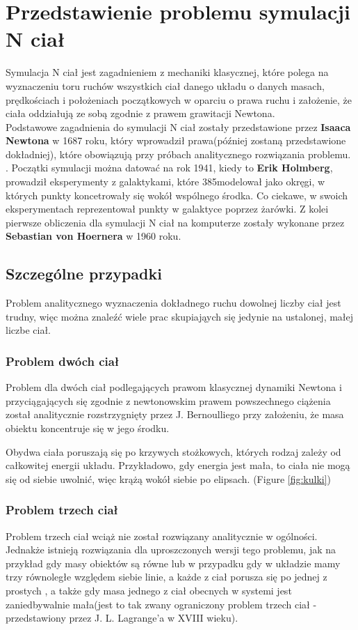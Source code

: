 \documentclass[14pt,twoside,a4paper]{article}
\theoremstyle{definition}
\begin{document}
\section{\LARGE Przedstawienie problemu symulacji N ciał}
\bigskip
Symulacja N ciał jest zagadnieniem z mechaniki klasycznej, które polega na wyznaczeniu toru ruchów wszystkich ciał danego układu o danych masach, prędkościach i położeniach początkowych w oparciu o prawa ruchu i założenie, że ciała oddziałują ze sobą zgodnie z prawem grawitacji Newtona. \\ 
Podstawowe zagadnienia do symulacji N ciał zostały przedstawione przez \textbf{Isaaca Newtona} w 1687 roku, który wprowadził prawa(później zostaną przedstawione dokładniej), które obowiązują przy próbach analitycznego rozwiązania problemu. \cite{Principia}. Początki symulacji można datować na rok 1941, kiedy to \textbf{Erik Holmberg}, prowadził eksperymenty z galaktykami, które 385modelował jako okręgi, w których punkty koncetrowały się wokół wspólnego środka. Co ciekawe, w swoich eksperymentach reprezentował punkty w galaktyce poprzez żarówki. \cite{holmberg} Z kolei pierwsze obliczenia dla symulacji N ciał na komputerze zostały wykonane przez \textbf{Sebastian von Hoernera} w 1960 roku. \cite{vonHoerner}

\subsection{\Large Szczególne przypadki}
Problem analitycznego wyznaczenia dokładnego ruchu dowolnej liczby ciał jest trudny, więc można znaleźć wiele prac skupiająych się jedynie na ustalonej, małej liczbe ciał.

\subsubsection{\large Problem dwóch ciał}
Problem dla dwóch ciał podlegających prawom klasycznej dynamiki Newtona i przyciągających się zgodnie z newtonowskim prawem powszechnego ciążenia został analitycznie rozstrzygnięty przez J. Bernoulliego przy założeniu, że masa obiektu koncentruje się w jego środku. \cite[str.~1-49]{fund}

Obydwa ciała poruszają się po krzywych stożkowych, których rodzaj zależy od całkowitej energii układu. Przykładowo, gdy energia jest mała, to ciała nie mogą się od siebie uwolnić, więc krążą wokół siebie po elipsach. (Figure \ref{fig:kulki})

\subsubsection{\large Problem trzech ciał}
Problem trzech ciał wciąż nie został rozwiązany analitycznie w ogólności. Jednakże istnieją rozwiązania dla uproszczonych wersji tego problemu, jak na przykład gdy masy obiektów są równe \cite{threebody1} lub w przypadku gdy w układzie mamy trzy równoległe względem siebie linie, a każde z ciał porusza się po jednej z prostych \cite{threebody2}, a także gdy masa jednego z ciał obecnych w systemi jest zaniedbywalnie mała(jest to tak zwany ograniczony problem trzech ciał - przedstawiony przez J. L. Lagrange'a w XVIII wieku). \cite{szebehely}
\end{document}
